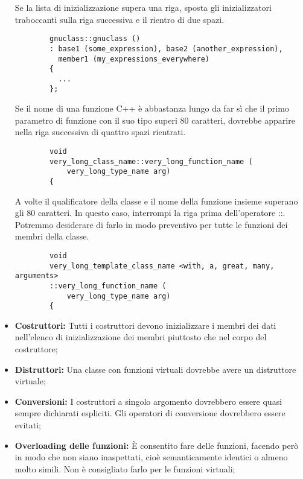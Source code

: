 \documentclass[../NomeDocumento.tex]{subfiles}
\begin{document}
\begin{itemize}
		Se la lista di inizializzazione supera una riga, sposta gli inizializzatori traboccanti sulla riga successiva e il rientro di due spazi.
		
		\begin{verbatim}
		gnuclass::gnuclass ()
		: base1 (some_expression), base2 (another_expression),
		  member1 (my_expressions_everywhere)
		{ 
		  ...
		};
		\end{verbatim}
		
		Se il nome di una funzione C++ è abbastanza lungo da far sì che il primo parametro di funzione con il suo tipo superi 80 caratteri, dovrebbe apparire nella riga successiva di quattro spazi rientrati.
		
		\begin{verbatim}
		void
		very_long_class_name::very_long_function_name (
		    very_long_type_name arg)
		{
		\end{verbatim}
		
		A volte il qualificatore della classe e il nome della funzione insieme superano gli 80 caratteri. In questo caso, interrompi la riga prima dell'operatore ::. Potremmo desiderare di farlo in modo preventivo per tutte le funzioni dei membri della classe.
		
		\begin{verbatim}
		void
		very_long_template_class_name <with, a, great, many, arguments>
		::very_long_function_name (
		    very_long_type_name arg)
		{
		\end{verbatim}		
		
		\item \textbf{Costruttori:} Tutti i costruttori devono inizializzare i membri dei dati nell'elenco di inizializzazione dei membri piuttosto che nel corpo del costruttore;
		
		\item \textbf{Distruttori:} Una classe con funzioni virtuali dovrebbe avere un distruttore virtuale;
		
		\item \textbf{Conversioni:} I costruttori a singolo argomento dovrebbero essere quasi sempre dichiarati espliciti.		
		Gli operatori di conversione dovrebbero essere evitati;
		
		\item \textbf{Overloading delle funzioni:} È consentito fare  delle funzioni, facendo però in modo che non siano inaspettati, cioè semanticamente identici o almeno molto simili. Non è consigliato farlo per le funzioni virtuali;
		

\end{itemize}
\end{document}
